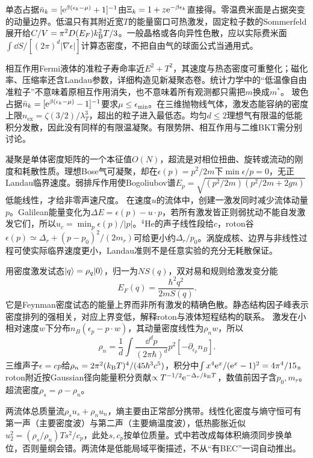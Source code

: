 \label{ch:qfluid}
单态占据$\bar n_k=[\mathrm e^{\beta(\epsilon_k-\mu)}+1]^{-1}$由$\Xi_k=1+z\mathrm e^{-\beta\epsilon_k}$直接得。零温费米面是占据突变的动量边界。低温只有其附近宽$T$的能量窗口可热激发，固定粒子数的Sommerfeld展开给$C/V=\pi^2D(E_F)k_{\mathrm B}^2T/3$。一般晶格或各向异性色散，应以实际费米面$\int\dd S/[(2\pi)^d|\nabla\epsilon|]$计算态密度，不把自由气的球面公式当通用式。

相互作用Fermi液体的准粒子寿命率近$E^2+T^2$，其速度与热态密度可重整化；磁化率、压缩率还含Landau参数，详细构造见新凝聚态卷。统计力学中的“低温像自由准粒子”不意味着原相互作用消失，也不意味着所有观测都只需把$m$换成$m^*$。
玻色占据$\bar n_k=[\mathrm e^{\beta(\epsilon_k-\mu)}-1]^{-1}$要求$\mu\le\epsilon_{\min}$。在三维抛物线气体，激发态能容纳的密度上限$n_{\mathrm{ex}}=\zeta(3/2)/\lambda_T^3$，超出的粒子进入最低态。均匀$d\le2$理想气有限温的低能积分发散，因此没有同样的有限温凝聚。有限势阱、相互作用与二维BKT需分别讨论。

凝聚是单体密度矩阵的一个本征值$O(N)$，超流是对相位扭曲、旋转或流动的刚度和耗散性质。理想Bose气可凝聚，却在$\epsilon(p)=p^2/2m$下$\min\epsilon/p=0$，无正Landau临界速度。弱排斥作用使Bogoliubov谱$E_p=\sqrt{(p^2/2m)(p^2/2m+2gn)}$低能线性，才给非零声速尺度。
在速度$u$的流体中，创建一激发同时减少流体动量$p$。Galilean能量变化为$\Delta E=\epsilon(p)-u\cdot p$，若所有激发皆正则弱扰动不能自发激发它们，所以$u_c=\min_p\epsilon(p)/|p|$。$^4$He的声子线性段给$c$，roton谷$\epsilon(p)\simeq\Delta_r+(p-p_0)^2/(2m_r)$可给更小约$\Delta_r/p_0$。涡旋成核、边界与非线性过程可使实际临界速度更小，Landau准则不是任意实验的充分无耗散保证。

用密度激发试态$\lvert q\rangle=\rho_q\lvert 0\rangle$，归一为$N S(q)$，双对易和规则给激发变分能
\begin{equation}
E_F(q)=\frac{\hbar^2q^2}{2mS(q)}.
\end{equation}
它是Feynman密度试态的能量上界而非所有激发的精确色散。静态结构因子峰表示密度排列的强相关，对应上界变低，解释roton与液体短程结构的联系。
激发在小相对速度$w$下分布$n_B(\epsilon_p-p\cdot w)$，其动量密度线性为$\rho_n w$，所以
\begin{equation}
\rho_n=\frac1d\int\frac{\dd^dp}{(2\pi\hbar)^d}p^2[-\partial_{\epsilon_p}n_B].
\end{equation}
三维声子$\epsilon=cp$给$\rho_n=2\pi^2(k_{\mathrm B} T)^4/(45\hbar^3c^5)$，积分中$\int x^4\mathrm e^x/(\mathrm e^x-1)^2=4\pi^4/15$。roton附近按Gaussian径向能量积分贡献$\propto T^{-1/2}\mathrm e^{-\Delta_r/k_{\mathrm B} T}$，数值前因子含$p_0,m_r$。超流密度$\rho_s=\rho-\rho_n$。

两流体总质量流$\rho_su_s+\rho_nu_n$，熵主要由正常部分携带。线性化密度与熵守恒可有第一声（主要密度波）与第二声（主要熵温度波），低热膨胀近似$u_2^2=(\rho_s/\rho_n)Ts^2/c_p$，此处$s,c_p$按单位质量。式中若改成每体积熵须同步换单位，否则量纲会错。两流体是低能局域平衡描述，不从“有BEC”一词自动推出。
